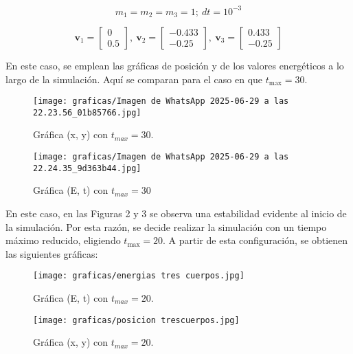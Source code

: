 \begin{equation}
    m_1=m_2=m_3=1;  \ dt= 10^{-3}
\end{equation}

\begin{equation}
    \mathbf{v}_1=\begin{bmatrix}
        0 \\ 0.5
    \end{bmatrix},
    \  \mathbf{v}_2=\begin{bmatrix}
        -0.433 \\ -0.25
    \end{bmatrix},
    \ \mathbf{v}_3=\begin{bmatrix}
        0.433 \\ -0.25
    \end{bmatrix}
\end{equation}

En este caso, se emplean las gráficas de posición y de los valores energéticos a lo largo de la simulación. Aquí se comparan para el caso en que \( t_{\text{max}} = 30 \).


\begin{figure}[H]
    \centering
    \texttt{[image: graficas/Imagen de WhatsApp 2025-06-29 a las 22.23.56\_01b85766.jpg]}
    \caption{Gráfica (x, y) con $t_{max}=30$.}
    \label{fig:enter-label}
\end{figure}

\begin{figure}[H]
    \centering
    \texttt{[image: graficas/Imagen de WhatsApp 2025-06-29 a las 22.24.35\_9d363b44.jpg]}
    \caption{Gráfica (E, t) con $t_{max}=30$}
    \label{fig:enter-label}
\end{figure}
En este caso, en las Figuras 2 y 3 se observa una estabilidad evidente al inicio de la simulación. Por esta razón, se decide realizar la simulación con un tiempo máximo reducido, eligiendo \( t_{\text{max}} = 20 \). A partir de esta configuración, se obtienen las siguientes gráficas:

\begin{figure}[H]
    \centering
    \texttt{[image: graficas/energias tres cuerpos.jpg]}
    \caption{Gráfica (E, t) con $t_{max}=20$.}
    \label{fig:enter-label}
\end{figure}

\begin{figure}[H]
    \centering
    \texttt{[image: graficas/posicion trescuerpos.jpg]}
    \caption{Gráfica (x, y) con $t_{max}=20$.}
    \label{fig:enter-label}
\end{figure}

